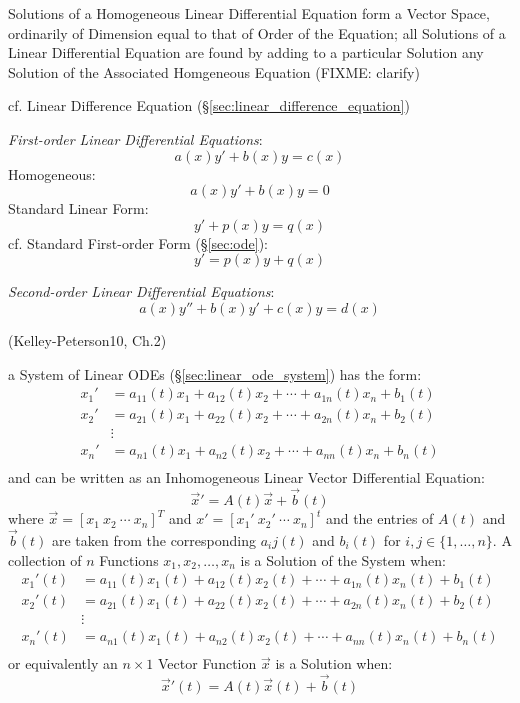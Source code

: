 Solutions of a Homogeneous Linear Differential Equation form a Vector Space,
ordinarily of Dimension equal to that of Order of the Equation; all Solutions
of a Linear Differential Equation are found by adding to a particular Solution
any Solution of the Associated Homgeneous Equation (FIXME: clarify)

cf. Linear Difference Equation (\S\ref{sec:linear_difference_equation})

\emph{First-order Linear Differential Equations}:
\[
  a(x) y' + b(x) y = c(x)
\]
Homogeneous:
\[
  a(x) y' + b(x) y = 0
\]
Standard Linear Form:
\[
  y' + p(x) y = q(x)
\]
cf. Standard First-order Form (\S\ref{sec:ode}):
\[
  y' = p(x) y + q(x)
\]

\emph{Second-order Linear Differential Equations}:
\[
  a(x) y'' + b(x) y' + c(x) y = d(x)
\]

\asterism

(Kelley-Peterson10, Ch.2)

a System of Linear ODEs (\S\ref{sec:linear_ode_system}) has the form:
\begin{align*}
  x_1' & = a_{11}(t)x_1 + a_{12}(t)x_2 + \cdots + a_{1n}(t)x_n + b_1(t) \\
  x_2' & = a_{21}(t)x_1 + a_{22}(t)x_2 + \cdots + a_{2n}(t)x_n + b_2(t) \\
    & \vdots \\
  x_n' & = a_{n1}(t)x_1 + a_{n2}(t)x_2 + \cdots + a_{nn}(t)x_n + b_n(t) \\
\end{align*}
and can be written as an Inhomogeneous Linear Vector Differential Equation:
\[
  \vec{x}' = A(t)\vec{x} + \vec{b}(t)
\]
where $\vec{x} = [x_1\ x_2\ \cdots\ x_n]^T$ and $x' =
[x_1'\ x_2'\ \cdots\ x_n]^t$ and the entries of $A(t)$ and $\vec{b}(t)$ are
taken from the corresponding $a_ij(t)$ and $b_i(t)$ for $i,j \in
\{1,\ldots,n\}$.
A collection of $n$ Functions $x_1, x_2, \ldots, x_n$ is a Solution of the
System when:
\begin{align*}
  x_1'(t) & = a_{11}(t)x_1(t) + a_{12}(t)x_2(t) + \cdots +
    a_{1n}(t)x_n(t) + b_1(t) \\
  x_2'(t) & = a_{21}(t)x_1(t) + a_{22}(t)x_2(t) + \cdots +
    a_{2n}(t)x_n(t) + b_2(t) \\
    & \vdots \\
  x_n'(t) & = a_{n1}(t)x_1(t) + a_{n2}(t)x_2(t) + \cdots +
    a_{nn}(t)x_n(t) + b_n(t) \\
\end{align*}
or equivalently an $n\times{1}$ Vector Function $\vec{x}$ is a Solution when:
\[
  \vec{x}'(t) = A(t)\vec{x}(t) + \vec{b}(t)
\]

